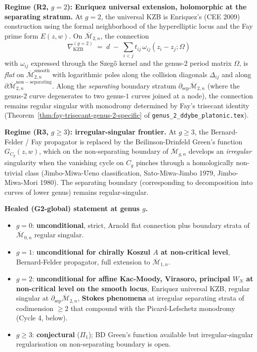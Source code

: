 \documentclass[12pt]{article}
\providecommand{\KZB}{\mathrm{KZB}}
\providecommand{\Mbar}{\overline{\mathcal{M}}}
\theoremstyle{definition}
\begin{document}
\textbf{Regime (R2, $g = 2$): Enriquez universal extension,
holomorphic at the separating stratum.}
At $g = 2$, the universal KZB is Enriquez's (CEE 2009)
construction using the formal neighborhood of the hyperelliptic
locus and the Fay prime form $E(z, w)$.  On $\Mbar_{2,n}$, the
connection
\[
   \nabla_{\KZB}^{(g=2)}
   \;=\; d \;-\; \sum_{i < j}t_{ij}\,\omega_{ij}(z_i - z_j; \Omega)
\]
with $\omega_{ij}$ expressed through the Szeg\H{o} kernel and the
genus-$2$ period matrix $\Omega$, is \emph{flat} on
$\Mbar_{2,n}^{\mathrm{smooth}}$ with logarithmic poles along the
collision diagonals $\Delta_{ij}$ and along
$\partial\Mbar_{2,n}^{\mathrm{non-separating}}$.
Along the \emph{separating} boundary stratum
$\partial_{\mathrm{sep}}\Mbar_{2,n}$ (where the genus-$2$ curve
degenerates to two genus-$1$ curves joined at a node), the
connection remains regular singular with monodromy determined
by Fay's trisecant identity
(Theorem~\ref{thm:fay-trisecant-genus-2-specific} of
\texttt{genus\_2\_ddybe\_platonic.tex}).

\textbf{Regime (R3, $g \geq 3$): irregular-singular frontier.}
At $g \geq 3$, the Bernard-Felder / Fay propagator is replaced
by the Beilinson-Drinfeld Green's function $G_{C_g}(z, w)$,
which on the non-separating boundary of $\Mbar_{g,n}$ develops
an \emph{irregular} singularity when the vanishing cycle on $C_g$
pinches through a homologically non-trivial class
(Jimbo-Miwa-Ueno classification, Sato-Miwa-Jimbo 1979,
Jimbo-Miwa-Mori 1980).
The separating boundary (corresponding to decomposition into
curves of lower genus) remains regular-singular.

\textbf{Healed (G2-global) statement at genus $g$.}
\begin{itemize}
\item $g = 0$: \textbf{unconditional}, strict, Arnold flat
  connection plus boundary strata of $\Mbar_{0,n}$ regular singular.
\item $g = 1$: \textbf{unconditional for chirally Koszul $A$
  at non-critical level}, Bernard-Felder propagator,
  full extension to $\Mbar_{1,n}$.
\item $g = 2$: \textbf{unconditional for affine Kac-Moody,
  Virasoro, principal $W_N$ at non-critical level on the
  smooth locus}, Enriquez universal KZB, regular singular at
  $\partial_{\mathrm{sep}}\Mbar_{2,n}$, \textbf{Stokes phenomena}
  at irregular separating strata of codimension $\geq 2$ that
  compound with the Picard-Lefschetz monodromy
  (Cycle 4, below).
\item $g \geq 3$: \textbf{conjectural} ($\Pi_1$);
  BD Green's function available but irregular-singular
  regularisation on non-separating boundary is open.
\end{itemize}
\end{document}
